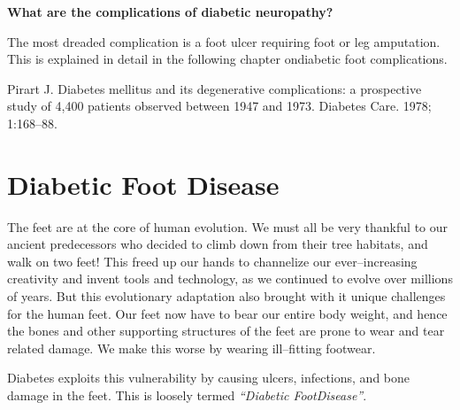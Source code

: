 \noindent\textbf{What are the complications of diabetic neuropathy?}

The most dreaded complication is a foot ulcer requiring foot or leg amputation. This is explained in detail in the following chapter on\break diabetic foot complications.

\begin{thebibliography}{99}
 Pirart J. Diabetes mellitus and its degenerative complications: a prospective study of 4,400 patients observed between 1947 and 1973. Diabetes Care. 1978; 1:168–88.
\end{thebibliography}


\chapter{Diabetic Foot Disease}\label{chap17}

The feet are at the core of human evolution. We must all be very thankful to our ancient predecessors who decided to climb down from their tree habitats, and walk on two feet! This freed up our hands to channe\-lize our ever–increasing creativity and invent tools and technology, as we continued to evolve over millions of years. But this evolutionary adaptation also brought with it unique challenges for the human feet. Our feet now have to bear our entire body weight, and hence the bones and other supporting structures of the feet are prone to wear and tear related damage. We make this worse by wearing ill–fitting footwear.

Diabetes exploits this vulnerability by causing ulcers, infections, and bone damage in the feet. This is loosely termed \textit{“Diabetic Foot\break Disease”}.

